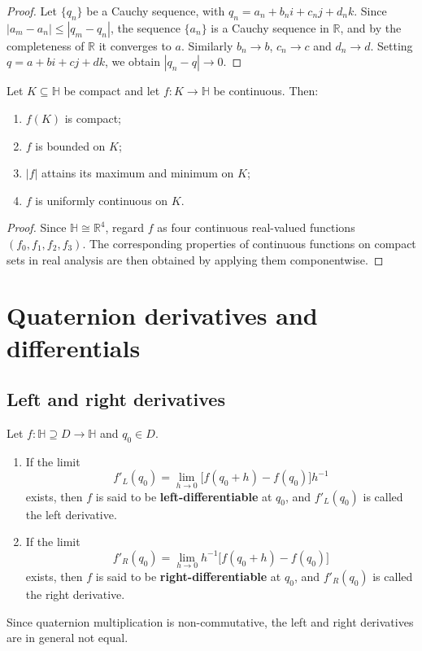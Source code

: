 \begin{proof}
Let $\{q_n\}$ be a Cauchy sequence, with $q_n=a_n+b_ni+c_nj+d_nk$. Since $|a_m-a_n|\le |q_m-q_n|$, the sequence $\{a_n\}$ is a Cauchy sequence in $\mathbb{R}$, and by the completeness of $\mathbb{R}$ it converges to $a$. Similarly $b_n\to b$, $c_n\to c$ and $d_n\to d$. Setting $q=a+bi+cj+dk$, we obtain $|q_n-q|\to 0$.
\end{proof}

\begin{theorem}\label{thm:q_continuous_compact}
Let $K\subseteq\mathbb{H}$ be compact and let $f:K\to\mathbb{H}$ be continuous. Then:
\begin{enumerate}[label=(\roman*)]
    \item $f(K)$ is compact;
    \item $f$ is bounded on $K$;
    \item $|f|$ attains its maximum and minimum on $K$;
    \item $f$ is uniformly continuous on $K$.
\end{enumerate}
\end{theorem}

\begin{proof}
Since $\mathbb{H}\cong\mathbb{R}^4$, regard $f$ as four continuous real-valued functions $(f_0,f_1,f_2,f_3)$. The corresponding properties of continuous functions on compact sets in real analysis are then obtained by applying them componentwise.
\end{proof}

\section{Quaternion derivatives and differentials}

\subsection{Left and right derivatives}

\begin{definition}\label{def:q_derivative_left_right}
Let $f:\mathbb{H}\supseteq D\to\mathbb{H}$ and $q_0\in D$.
\begin{enumerate}[label=(\roman*)]
    \item If the limit
    \[
    f'_L(q_0)=\lim_{h\to 0}\bigl[f(q_0+h)-f(q_0)\bigr]h^{-1}
    \]
    exists, then $f$ is said to be \textbf{left-differentiable} at $q_0$, and $f'_L(q_0)$ is called the left derivative.
    \item If the limit
    \[
    f'_R(q_0)=\lim_{h\to 0}h^{-1}\bigl[f(q_0+h)-f(q_0)\bigr]
    \]
    exists, then $f$ is said to be \textbf{right-differentiable} at $q_0$, and $f'_R(q_0)$ is called the right derivative.
\end{enumerate}
Since quaternion multiplication is non-commutative, the left and right derivatives are in general not equal.
\end{definition}

